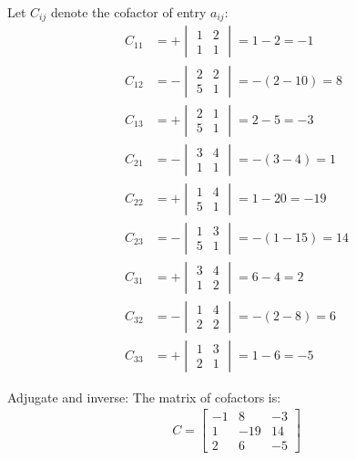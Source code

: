 \begin{enumerate}[label=\thesubsection.\arabic*, ref=\thesubsection.\theenumi]
Let $C_{ij}$ denote the cofactor of entry $a_{ij}$:
\begin{align*}
	C_{11} &= + \begin{vmatrix} 1 & 2 \\ 1 & 1 \end{vmatrix} = 1 - 2 = -1 \\
	C_{12} &= - \begin{vmatrix} 2 & 2 \\ 5 & 1 \end{vmatrix} = -(2 - 10) = 8 \\
	C_{13} &= + \begin{vmatrix} 2 & 1 \\ 5 & 1 \end{vmatrix} = 2 - 5 = -3 \\
	C_{21} &= - \begin{vmatrix} 3 & 4 \\ 1 & 1 \end{vmatrix} = -(3 - 4) = 1 \\
	C_{22} &= + \begin{vmatrix} 1 & 4 \\ 5 & 1 \end{vmatrix} = 1 - 20 = -19 \\
	C_{23} &= - \begin{vmatrix} 1 & 3 \\ 5 & 1 \end{vmatrix} = -(1 - 15) = 14 \\
	C_{31} &= + \begin{vmatrix} 3 & 4 \\ 1 & 2 \end{vmatrix} = 6 - 4 = 2 \\
	C_{32} &= - \begin{vmatrix} 1 & 4 \\ 2 & 2 \end{vmatrix} = -(2 - 8) = 6 \\
	C_{33} &= + \begin{vmatrix} 1 & 3 \\ 2 & 1 \end{vmatrix} = 1 - 6 = -5
\end{align*}

Adjugate and inverse:
The matrix of cofactors is:
\begin{align*}
	C = \begin{bmatrix}
		-1 & 8 & -3 \\
		1 & -19 & 14 \\
		2 & 6 & -5
	\end{bmatrix}
\end{align*}


\end{enumerate}
